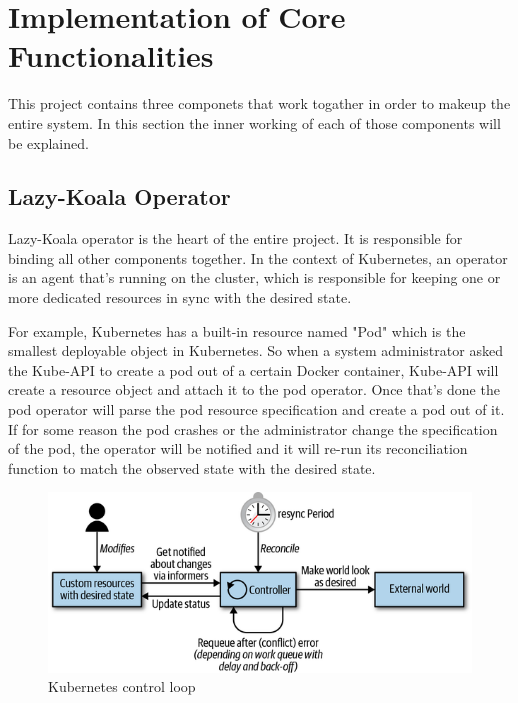 \section{Implementation of Core Functionalities}

This project contains three componets that work togather in order to makeup the entire system. In this section the inner working of each of those components will be explained.

\subsection{Lazy-Koala Operator}

Lazy-Koala operator is the heart of the entire project. It is responsible for binding all other components together. In the context of Kubernetes, an operator is an agent that's running on the cluster, which is responsible for keeping one or more dedicated resources in sync with the desired state. 

For example, Kubernetes has a built-in resource named "Pod" which is the smallest deployable object in Kubernetes. So when a system administrator asked the Kube-API to create a pod out of a certain Docker container, Kube-API will create a resource object and attach it to the pod operator. Once that's done the pod operator will parse the pod resource specification and create a pod out of it. If for some reason the pod crashes or the administrator change the specification of the pod, the operator will be notified and it will re-run its reconciliation function to match the observed state with the desired state.

\begin{figure}[H]
    \includegraphics[width=11.5cm]{assets/implementation/kubernetes-control-loop.png}
    \caption{Kubernetes control loop \citep{hausenblas2019programming}}
\end{figure}


